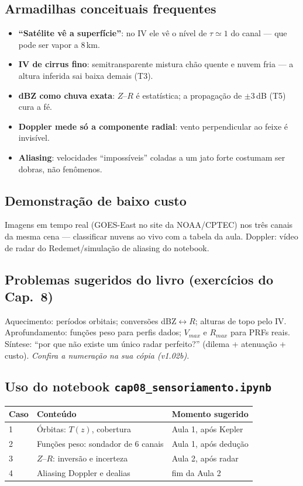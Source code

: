 \subsection*{Armadilhas conceituais frequentes}

\begin{itemize}
  \item \textbf{``Satélite vê a superfície''}: no IV ele vê o nível de
        $\tau\simeq1$ do canal — que pode ser vapor a 8\,km.
  \item \textbf{IV de cirrus fino}: semitransparente mistura chão quente e
        nuvem fria — a altura inferida sai baixa demais (T3).
  \item \textbf{dBZ como chuva exata}: $Z$--$R$ é estatística; a
        propagação de $\pm3$\,dB (T5) cura a fé.
  \item \textbf{Doppler mede só a componente radial}: vento perpendicular
        ao feixe é invisível.
  \item \textbf{Aliasing}: velocidades ``impossíveis'' coladas a um jato
        forte costumam ser dobras, não fenômenos.
\end{itemize}

\subsection*{Demonstração de baixo custo}

Imagens em tempo real (GOES-East no site da NOAA/CPTEC) nos três canais da
mesma cena — classificar nuvens ao vivo com a tabela da aula. Doppler:
vídeo de radar do Redemet/simulação de aliasing do notebook.

\subsection*{Problemas sugeridos do livro (exercícios do Cap.~8)}

Aquecimento: períodos orbitais; conversões dBZ$\leftrightarrow$$R$; alturas
de topo pelo IV. Aprofundamento: funções peso para perfis dados; $V_{max}$
e $R_{max}$ para PRFs reais. Síntese: ``por que não existe um único radar
perfeito?'' (dilema + atenuação + custo).
\emph{Confira a numeração na sua cópia (v1.02b).}

\subsection*{Uso do notebook \texttt{cap08\_sensoriamento.ipynb}}

\begin{center}
\begin{tabular}{lll}
\hline
Caso & Conteúdo & Momento sugerido \\
\hline
1 & Órbitas: $T(z)$, cobertura & Aula 1, após Kepler \\
2 & Funções peso: sondador de 6 canais & Aula 1, após dedução \\
3 & $Z$--$R$: inversão e incerteza & Aula 2, após radar \\
4 & Aliasing Doppler e dealias & fim da Aula 2 \\
\hline
\end{tabular}
\end{center}


